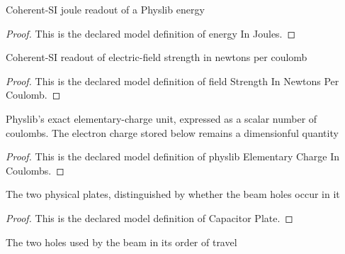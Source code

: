 \begin{definition}
  \label{def:physics:phyx-mini-0838:phyxminiproblems-problemphyxmini0838-energyinjoules}
  Coherent-SI joule readout of a Physlib energy
\end{definition}
\begin{proof}
  This is the declared model definition of energy In Joules.
\end{proof}
\begin{definition}
  \label{def:physics:phyx-mini-0838:phyxminiproblems-problemphyxmini0838-fieldstrengthinnewtonspercoulomb}
  Coherent-SI readout of electric-field strength in newtons per coulomb
\end{definition}
\begin{proof}
  This is the declared model definition of field Strength In Newtons Per Coulomb.
\end{proof}
\begin{definition}
  \label{def:physics:phyx-mini-0838:phyxminiproblems-problemphyxmini0838-physlibelementarychargeincoulombs}
  Physlib's exact elementary-charge unit, expressed as a scalar number of coulombs. The electron charge stored below remains a dimensionful quantity
\end{definition}
\begin{proof}
  This is the declared model definition of physlib Elementary Charge In Coulombs.
\end{proof}
\begin{definition}
  \label{def:physics:phyx-mini-0838:phyxminiproblems-problemphyxmini0838-capacitorplate}
  The two physical plates, distinguished by whether the beam holes occur in it
\end{definition}
\begin{proof}
  This is the declared model definition of Capacitor Plate.
\end{proof}
\begin{definition}
  \label{def:physics:phyx-mini-0838:phyxminiproblems-problemphyxmini0838-beamhole}
  The two holes used by the beam in its order of travel
\end{definition}
